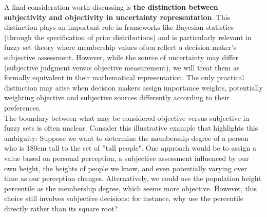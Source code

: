 A final consideration worth discussing is \textbf{the distinction between subjectivity and objectivity in uncertainty representation}. 
This distinction plays an important role in frameworks like Bayesian statistics (through the specification of prior distributions) and is particularly relevant in fuzzy set theory where membership values often reflect a decision maker's subjective assessment. However, while the source of uncertainty may differ (subjective judgment versus objective measurement), we will treat them as formally equivalent in their mathematical representation. The only practical distinction may arise when decision makers assign importance weights, potentially weighting objective and subjective sources differently according to their preferences.\\

The boundary between what may be considered objective versus subjective in fuzzy sets is often unclear. Consider this illustrative example that highlights this ambiguity:
Suppose we want to determine the membership degree of a person who is 180cm tall to the set of ''tall people". One approach would be to assign a value based on personal perception, a subjective assessment influenced by our own height, the heights of people we know, and even potentially varying over time as our perception changes. Alternatively, we could use the population height percentile as the membership degree, which seems more objective. However, this choice still involves subjective decisions: for instance, why use the percentile directly rather than its square root?\\